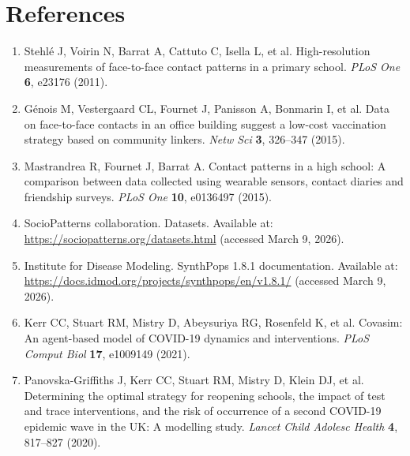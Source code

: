 \documentclass[9pt,twocolumn,twoside]{pnas-new}
\begin{document}


\showacknow{} %

% 

\newpage
\section*{References}

\begin{enumerate}

\item Stehlé J, Voirin N, Barrat A, Cattuto C, Isella L, et al. High-resolution measurements of face-to-face contact patterns in a primary school. \textit{PLoS One} \textbf{6}, e23176 (2011).

\item Génois M, Vestergaard CL, Fournet J, Panisson A, Bonmarin I, et al. Data on face-to-face contacts in an office building suggest a low-cost vaccination strategy based on community linkers. \textit{Netw Sci} \textbf{3}, 326--347 (2015).

\item Mastrandrea R, Fournet J, Barrat A. Contact patterns in a high school: A comparison between data collected using wearable sensors, contact diaries and friendship surveys. \textit{PLoS One} \textbf{10}, e0136497 (2015).

\item SocioPatterns collaboration. Datasets. Available at: \url{https://sociopatterns.org/datasets.html} (accessed March 9, 2026).

\item Institute for Disease Modeling. SynthPops 1.8.1 documentation. Available at: \url{https://docs.idmod.org/projects/synthpops/en/v1.8.1/} (accessed March 9, 2026).

\item Kerr CC, Stuart RM, Mistry D, Abeysuriya RG, Rosenfeld K, et al. Covasim: An agent-based model of COVID-19 dynamics and interventions. \textit{PLoS Comput Biol} \textbf{17}, e1009149 (2021).

\item Panovska-Griffiths J, Kerr CC, Stuart RM, Mistry D, Klein DJ, et al. Determining the optimal strategy for reopening schools, the impact of test and trace interventions, and the risk of occurrence of a second COVID-19 epidemic wave in the UK: A modelling study. \textit{Lancet Child Adolesc Health} \textbf{4}, 817--827 (2020).


\end{enumerate}
\end{document}
